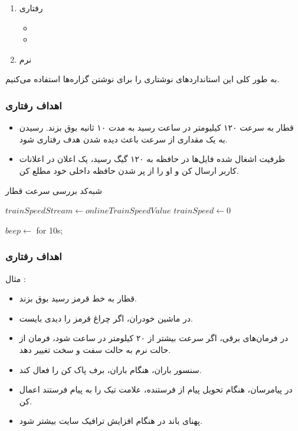 \begin{enumerate}
    \item رفتاری
    \begin{itemize}
        \item {}
        \item {}
    \end{itemize}
    \item نرم
\end{enumerate}

به طور کلی این استاندارد‌های نوشتاری را برای نوشتن گزاره‌ها استفاده می‌کنیم.

\subsubsection{اهداف رفتاری }

\begin{itemize}
    \item قطار به سرعت ۱۲۰ کیلیومتر در ساعت رسید به مدت ۱۰ ثانیه بوق بزند. رسیدن
    به یک مقداری از سرعت باعث دیده شدن هدف رفتاری  شود.
    \item ظرفیت اشغال شده فایل‌ها در حافظه به ۱۲۰ گیگ رسید، یک اعلان در اعلانات
    کاربر ارسال کن و او را از پر شدن حافظه داخلی خود مطلع کن.
\end{itemize}

\begin{algorithm}
    \caption{شبه‌کد بررسی سرعت قطار}
    \label{alg:trainSpeedAlgo}
    \begin{LTR}
        \begin{algorithmic}
            \State $trainSpeedStream \gets onlineTrainSpeedValue$
            \State $trainSpeed \gets 0$

                    \State $beep \gets$ for 10s;
                \EndIf
            \EndWhile
        \end{algorithmic}
    \end{LTR}
\end{algorithm}

\subsubsection{اهداف رفتاری }

مثال :

\begin{itemize}
    \item قطار به خط قرمز رسید بوق بزند.
    \item در ماشین خودران، اگر چراغ قرمز را دیدی بایست.
    \item در فرمان‌های برقی، اگر سرعت بیشتر از ۲۰ کیلومتر در ساعت شود، فرمان از
    حالت نرم به حالت سفت و سخت تغییر دهد.
    \item سنسور باران، هنگام باران، برف پاک کن را فعال کند.
    \item در پیامرسان، هنگام تحویل پیام از فرستنده، علامت تیک را به پیام فرستند
    اعمال کن.
    \item پهنای باند در هنگام افزایش ترافیک سایت بیشتر شود.
\end{itemize}

